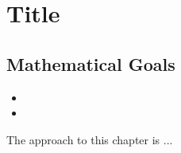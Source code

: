 \section{Title}
\subsection{Mathematical Goals}

\begin{theorem}
	\begin{itemize}
		\item 
		\item
	\end{itemize}
\end{theorem}
The approach to this chapter is ...